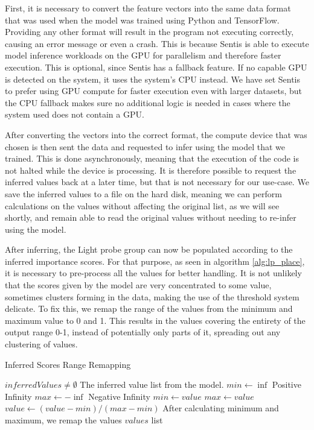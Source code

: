 First, it is necessary to convert the feature vectors into the same data format that was used when the model was trained using Python and TensorFlow. Providing any other format will result in the program not executing correctly, causing an error message or even a crash. This is because Sentis is able to execute model inference workloads on the GPU for parallelism and therefore faster execution. This is optional, since Sentis has a fallback feature. If no capable GPU is detected on the system, it uses the system's CPU instead. We have set Sentis to prefer using GPU compute for faster execution even with larger datasets, but the CPU fallback makes sure no additional logic is needed in cases where the system used does not contain a GPU. 

After converting the vectors into the correct format, the compute device that was chosen is then sent the data and requested to infer using the model that we trained. This is done asynchronously, meaning that the execution of the code is not halted while the device is processing. It is therefore possible to request the inferred values back at a later time, but that is not necessary for our use-case. We save the inferred values to a file on the hard disk, meaning we can perform calculations on the values without affecting the original list, as we will see shortly, and remain able to read the original values without needing to re-infer using the model.

After inferring, the Light probe group can now be populated according to the inferred importance scores. For that purpose, as seen in algorithm \ref{alg:lp_place}, it is necessary to pre-process all the values for better handling. It is not unlikely that the scores given by the model are very concentrated to some value, sometimes clusters forming in the data, making the use of the threshold system delicate. To fix this, we remap the range of the values from the minimum and maximum value to 0 and 1. This results in the values covering the entirety of the output range 0-1, instead of potentially only parts of it, spreading out any clustering of values.

\begin{algorithm}
	\caption{Inferred Scores Range Remapping}
	\label{alg:lp_place}
	\begin{algorithmic}[1]
		\Require $inferredValues \neq \emptyset$
		\Comment The inferred value list from the model.
		\State $min \gets \inf$
		\Comment Positive Infinity
		\State $max \gets -\inf$
		\Comment Negative Infinity
				\State $min \gets value$
				\State $max \gets value$
			\EndIf
		\EndFor
			\State $value \gets (value - min) / (max - min)$
			\Comment After calculating minimum and maximum, we remap the values
			\label{alg:lp_place:11}
		\EndFor
		\State \Return $values$ list
	\end{algorithmic}
\end{algorithm}

